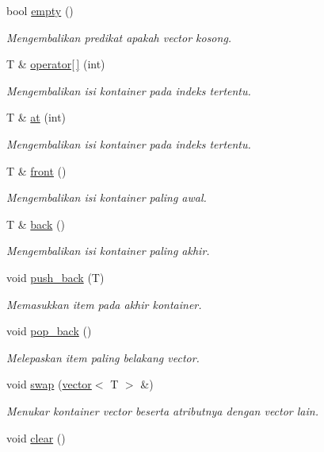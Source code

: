 \begin{DoxyCompactItemize}
bool \hyperlink{classvector_af342adf8e0f862f5d91b119dd108bf25}{empty} ()
\begin{DoxyCompactList}\small\item\em Mengembalikan predikat apakah vector kosong. \end{DoxyCompactList}\item 
T \& \hyperlink{classvector_a87628125f574ff26aa35e8c7eb726108}{operator\mbox{[}$\,$\mbox{]}} (int)
\begin{DoxyCompactList}\small\item\em Mengembalikan isi kontainer pada indeks tertentu. \end{DoxyCompactList}\item 
T \& \hyperlink{classvector_acb130730b5e99b862bb6770b9c33a6ac}{at} (int)
\begin{DoxyCompactList}\small\item\em Mengembalikan isi kontainer pada indeks tertentu. \end{DoxyCompactList}\item 
T \& \hyperlink{classvector_a60c0c3c2925224f41b2d8405bd138ebb}{front} ()
\begin{DoxyCompactList}\small\item\em Mengembalikan isi kontainer paling awal. \end{DoxyCompactList}\item 
T \& \hyperlink{classvector_a13d864f69391af4f471d111d68c19b9c}{back} ()
\begin{DoxyCompactList}\small\item\em Mengembalikan isi kontainer paling akhir. \end{DoxyCompactList}\item 
void \hyperlink{classvector_a44266e46c0784ef64b478ad9e931ee2e}{push\+\_\+back} (T)
\begin{DoxyCompactList}\small\item\em Memasukkan item pada akhir kontainer. \end{DoxyCompactList}\item 
void \hyperlink{classvector_aeec9e5d602d555d466a936310aa47866}{pop\+\_\+back} ()
\begin{DoxyCompactList}\small\item\em Melepaskan item paling belakang vector. \end{DoxyCompactList}\item 
void \hyperlink{classvector_acb86c331d5493acd8da68386292d5642}{swap} (\hyperlink{classvector}{vector}$<$ T $>$ \&)
\begin{DoxyCompactList}\small\item\em Menukar kontainer vector beserta atributnya dengan vector lain. \end{DoxyCompactList}\item 
\hypertarget{classvector_a1a91cd18e54c382af1097d630405398f}{}void \hyperlink{classvector_a1a91cd18e54c382af1097d630405398f}{clear} ()\label{classvector_a1a91cd18e54c382af1097d630405398f}


\end{DoxyCompactItemize}
